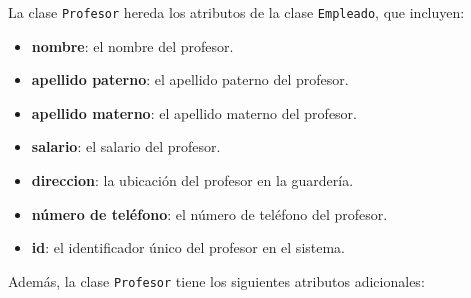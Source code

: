 La clase \texttt{Profesor} hereda los atributos de la clase \texttt{Empleado}, que incluyen:

\begin{itemize}
\item \textbf{nombre}: el nombre del profesor.
\item \textbf{apellido paterno}: el apellido paterno del profesor.
\item \textbf{apellido materno}: el apellido materno del profesor.

\item \textbf{salario}: el salario del profesor.
\item \textbf{direccion}: la ubicación del profesor en la guardería.

\item \textbf{número de teléfono}: el número de teléfono del profesor.
\item \textbf{id}: el identificador único del profesor en el sistema.
\end{itemize}

Además, la clase \texttt{Profesor} tiene los siguientes atributos adicionales:

